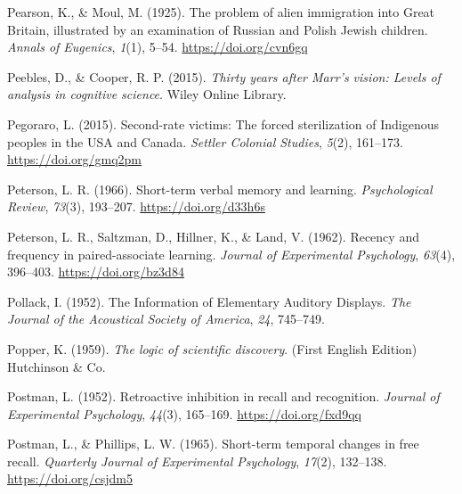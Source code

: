 \documentclass[
  oneside,
  12pt]{crumpbook}
\newlength{\cslhangindent}
\newlength{\cslentryspacingunit} %
\newenvironment{CSLReferences}[2] %
 {%
  \setlength{\parindent}{0pt}
  \ifodd #1
  \let\oldpar\par
  \def\par{\hangindent=\cslhangindent\oldpar}
  \fi
  \setlength{\parskip}{#2\cslentryspacingunit}
 }%
 {}
\begin{document}
\begin{CSLReferences}{1}{0}
\leavevmode{}%
Pearson, K., \& Moul, M. (1925). The problem of alien immigration into {Great Britain}, illustrated by an examination of {Russian} and {Polish Jewish} children. \emph{Annals of Eugenics}, \emph{1}(1), 5--54. \url{https://doi.org/cvn6gq}

\leavevmode{}%
Peebles, D., \& Cooper, R. P. (2015). \emph{Thirty years after {Marr}'s vision: {Levels} of analysis in cognitive science}. {Wiley Online Library}.

\leavevmode{}%
Pegoraro, L. (2015). Second-rate victims: {The} forced sterilization of {Indigenous} peoples in the {USA} and {Canada}. \emph{Settler Colonial Studies}, \emph{5}(2), 161--173. \url{https://doi.org/gmq2pm}

\leavevmode{}%
Peterson, L. R. (1966). Short-term verbal memory and learning. \emph{Psychological Review}, \emph{73}(3), 193--207. \url{https://doi.org/d33h6s}

\leavevmode{}%
Peterson, L. R., Saltzman, D., Hillner, K., \& Land, V. (1962). Recency and frequency in paired-associate learning. \emph{Journal of Experimental Psychology}, \emph{63}(4), 396--403. \url{https://doi.org/bz3d84}

\leavevmode{}%
Pollack, I. (1952). The {Information} of {Elementary Auditory Displays}. \emph{The Journal of the Acoustical Society of America}, \emph{24}, 745--749.

\leavevmode{}%
Popper, K. (1959). \emph{The logic of scientific discovery}. {(First English Edition) Hutchinson \& Co}.

\leavevmode{}%
Postman, L. (1952). Retroactive inhibition in recall and recognition. \emph{Journal of Experimental Psychology}, \emph{44}(3), 165--169. \url{https://doi.org/fxd9qq}

\leavevmode{}%
Postman, L., \& Phillips, L. W. (1965). Short-term temporal changes in free recall. \emph{Quarterly Journal of Experimental Psychology}, \emph{17}(2), 132--138. \url{https://doi.org/csjdm5}


\end{CSLReferences}
\end{document}
